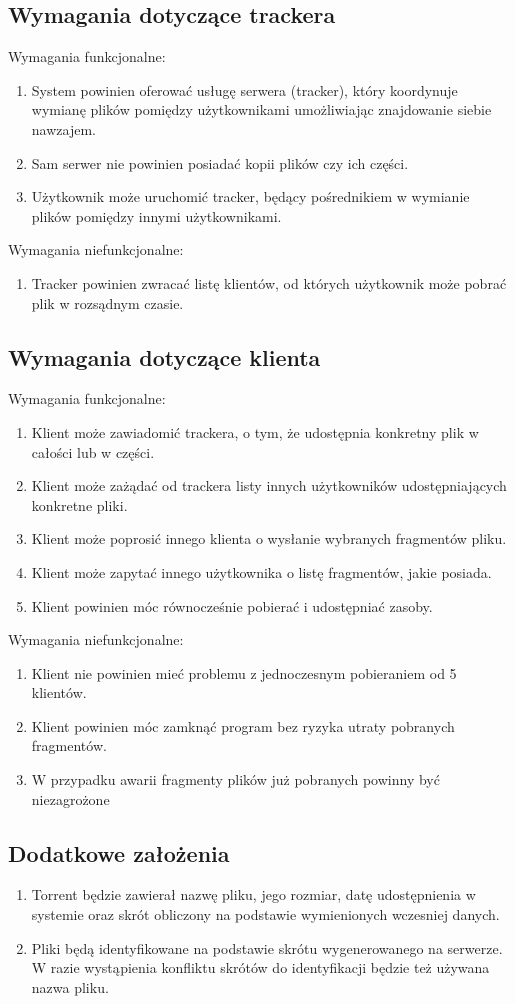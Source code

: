 \documentclass[11pt]{article}
\begin{document}
\subsection{Wymagania dotyczące trackera}
Wymagania funkcjonalne:
\begin{enumerate}
\item System powinien oferować usługę serwera (tracker), który koordynuje wymianę plików pomiędzy użytkownikami umożliwiając znajdowanie siebie nawzajem.
\item Sam serwer nie powinien posiadać kopii plików czy ich części.
\item Użytkownik może uruchomić tracker, będący pośrednikiem w wymianie plików pomiędzy innymi użytkownikami.
\end{enumerate}
Wymagania niefunkcjonalne:
\begin{enumerate}
\item Tracker powinien zwracać listę klientów, od których użytkownik może pobrać plik w rozsądnym czasie.
\end{enumerate}
\subsection{Wymagania dotyczące klienta}
Wymagania funkcjonalne:
\begin{enumerate}
\item Klient może zawiadomić trackera, o tym, że udostępnia konkretny plik w całości lub w części.
\item Klient może zażądać od trackera listy innych użytkowników udostępniających konkretne pliki.
\item Klient może poprosić innego klienta o wysłanie wybranych fragmentów pliku.
\item Klient może zapytać innego użytkownika o listę fragmentów, jakie posiada.
\item Klient powinien móc równocześnie pobierać i udostępniać zasoby.
\end{enumerate}
Wymagania niefunkcjonalne:
\begin{enumerate}
\item Klient nie powinien mieć problemu z jednoczesnym pobieraniem od 5 klientów.
\item Klient powinien móc zamknąć program bez ryzyka utraty pobranych fragmentów.
\item W przypadku awarii fragmenty plików już pobranych powinny być niezagrożone
\end{enumerate}

\subsection{Dodatkowe założenia}
\begin{enumerate}
\item Torrent będzie zawierał nazwę pliku, jego rozmiar, datę udostępnienia w systemie oraz skrót obliczony na podstawie wymienionych wczesniej danych.
\item Pliki będą identyfikowane na podstawie skrótu wygenerowanego na serwerze. W razie wystąpienia konfliktu skrótów do identyfikacji będzie też używana nazwa pliku. 
\end{enumerate}
\end{document}
